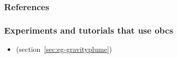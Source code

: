 \subsubsection{References}

\subsubsection{Experiments and tutorials that use obcs}
\label{sec:pkg:obcs:experiments}

\begin{itemize}
\item {} (section~\ref{sec:eg-gravityplume})
\end{itemize}


